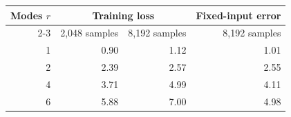 \begin{tabular}{rrrr}
\toprule
Modes $r$ & \multicolumn{2}{c}{Training loss} & Fixed-input error \\
\cmidrule(lr){2-3}
 & 2,048 samples & 8,192 samples & 8,192 samples \\
\midrule
1 & 0.90 & 1.12 & 1.01 \\
2 & 2.39 & 2.57 & 2.55 \\
4 & 3.71 & 4.99 & 4.11 \\
6 & 5.88 & 7.00 & 4.98 \\
\bottomrule
\end{tabular}
